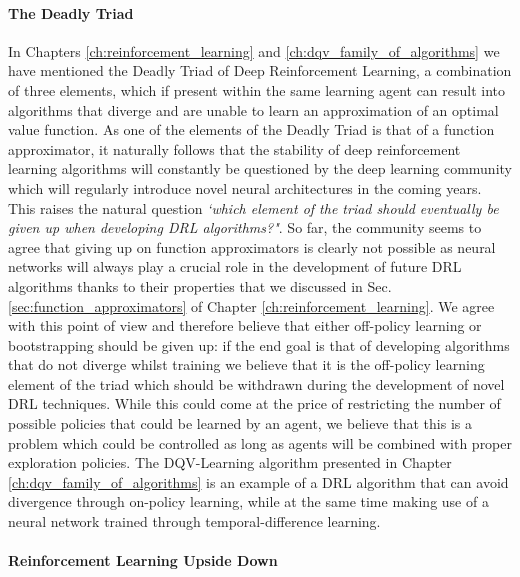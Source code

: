 \paragraph{The Deadly Triad}
In Chapters \ref{ch:reinforcement_learning} and \ref{ch:dqv_family_of_algorithms} we have mentioned the Deadly Triad of Deep Reinforcement Learning, a combination of three elements, which if present within the same learning agent can result into algorithms that diverge and are unable to learn an approximation of an optimal value function. As one of the elements of the Deadly Triad is that of a function approximator, it naturally follows that the stability of deep reinforcement learning algorithms will constantly be questioned by the deep learning community which will regularly introduce novel neural architectures in the coming years. This raises the natural question \textit{`which element of the triad should eventually be given up when developing DRL algorithms?"}. So far, the community seems to agree that giving up on function approximators is clearly not possible as neural networks will always play a crucial role in the development of future DRL algorithms \cite{van2018deep_triad,hernandez2019understanding,fedus2020revisiting} thanks to their properties that we discussed in Sec. \ref{sec:function_approximators} of Chapter \ref{ch:reinforcement_learning}. We agree with this point of view and therefore believe that either off-policy learning or bootstrapping should be given up: if the end goal is that of developing algorithms that do not diverge whilst training we believe that it is the off-policy learning element of the triad which should be withdrawn during the development of novel DRL techniques. While this could come at the price of restricting the number of possible policies that could be learned by an agent, we believe that this is a problem which could be controlled as long as agents will be combined with proper exploration policies. The DQV-Learning algorithm presented in Chapter \ref{ch:dqv_family_of_algorithms} is an example of a DRL algorithm that can avoid divergence through on-policy learning, while at the same time making use of a neural network trained through temporal-difference learning. 


\paragraph{Reinforcement Learning Upside Down}






